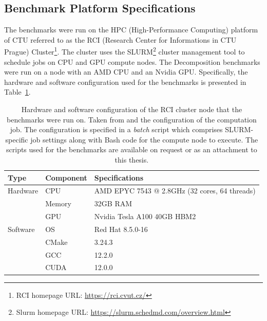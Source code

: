 \subsection{Benchmark Platform Specifications}\label{Subsection:comparing-decomposers-and-solvers->decomposition-project-benchmarks->benchmark-platform-specifications}
The benchmarks were run on the HPC (High-Performance Computing) platform of CTU referred to as the RCI (Research Center for Informations in CTU Prague) Cluster\footnote{RCI homepage URL: \url{https://rci.cvut.cz/}}.
The cluster uses the SLURM\footnote{Slurm homepage URL: \url{https://slurm.schedmd.com/overview.html}} cluster management tool to schedule jobs on CPU and GPU compute nodes.
The Decomposition benchmarks were run on a node with an AMD CPU and an Nvidia GPU.
Specifically, the hardware and software configuration used for the benchmarks is presented in Table~\ref{Table:comparing-decomposers-and-solvers->decomposition-project-benchmarks->benchmark-platform-specifications->RCI-node-hardware-software-specifications}.

\begin{table}[ht!]
	\centering
	\begin{tabular}{|l|l|l|}
		\hline
		\rowcolor[HTML]{C0C0C0} \textbf{Type} & \textbf{Component} & \textbf{Specifications}      \\ \hline
		Hardware                         & CPU    & AMD EPYC 7543 @ 2.8GHz (32 cores, 64 threads) \\
		                                 & Memory & 32GB RAM                                      \\
		                                 & GPU    & Nvidia Tesla A100 40GB HBM2                   \\ \hline
		\rowcolor[HTML]{EFEFEF} Software & OS     & Red Hat 8.5.0-16                              \\
		\rowcolor[HTML]{EFEFEF}          & CMake  & 3.24.3                                        \\
		\rowcolor[HTML]{EFEFEF}          & GCC    & 12.2.0                                        \\
		\rowcolor[HTML]{EFEFEF}          & CUDA   & 12.0.0                                        \\ \hline
	\end{tabular}
	\caption{Hardware and software configuration of the RCI cluster node that the benchmarks were run on.
		Taken from  \cite{9V4RBlLGVAweD9V9} and the configuration of the computation job.
		The configuration is specified in a \textit{batch} script which comprises SLURM-specific job settings along with Bash code for the compute node to execute.
		The scripts used for the benchmarks are available on request or as an attachment to this thesis.
	}
	\label{Table:comparing-decomposers-and-solvers->decomposition-project-benchmarks->benchmark-platform-specifications->RCI-node-hardware-software-specifications}
\end{table}



